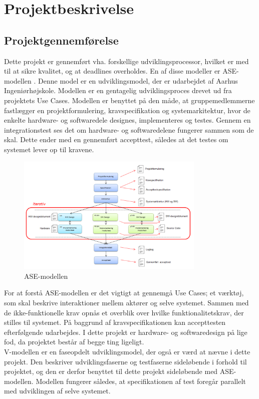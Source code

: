 \chapter{Projektbeskrivelse}
\section{Projektgennemførelse}
 
Dette projekt er gennemført vha. forskellige udviklingsprocessor, hvilket er med til at sikre kvalitet, og at deadlines overholdes. En af disse modeller er ASE-modellen \cite{ISE}. Denne model er en udviklingsmodel, der er udarbejdet af Aarhus Ingeniørhøjskole. Modellen er en gentagelig udviklingsproces drevet ud fra projektets Use Cases. Modellen er benyttet på den måde, at gruppemedlemmerne fastlægger en projektformulering, kravspecifikation og systemarkitektur, hvor de enkelte hardware- og softwaredele designes, implementeres og testes. Gennem en integrationstest ses det om hardware- og softwaredelene fungerer sammen som de skal.  
Dette ender med en gennemført accepttest, således at det testes om systemet lever op til kravene.
\begin{figure}[H]
	\centering
	\includegraphics[width=0.8\textwidth]{Figurer/AseModellen}
	\caption{ASE-modellen}
	\label{fig:ASE_model}
\end{figure}

For at forstå ASE-modellen \cite{ISE} er det vigtigt at gennemgå Use Cases; et værktøj, som skal beskrive interaktioner mellem aktører og selve systemet. Sammen med de ikke-funktionelle krav opnås et overblik over hvilke funktionalitetskrav, der stilles til systemet. På baggrund af kravspecifikationen kan accepttesten efterfølgende udarbejdes. I dette projekt er hardware- og softwaredesign på lige fod, da projektet består af begge ting ligeligt.\\
\newline
V-modellen \cite{ISE} er en faseopdelt udviklingsmodel, der også er værd at nævne i dette projekt. Den beskriver udviklingsfaserne og testfaserne sideløbende i forhold til projektet, og den er derfor benyttet til dette projekt sideløbende med ASE-modellen. Modellen fungerer således, at specifikationen af test foregår parallelt med udviklingen af selve systemet.

